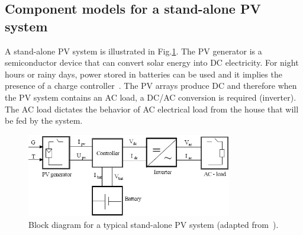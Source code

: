 \documentclass[review]{elsarticle}
\begin{document}
%
\subsection{Component models for a stand-alone PV system }
A stand-alone PV system is illustrated in Fig.\ref{fig:blockdiagram}. The PV generator is a semiconductor device that can convert solar energy into DC electricity. %
For night hours or rainy days, power stored in batteries can be used and it implies the presence of a charge controller~\citep{Hansen}. The PV arrays produce DC and therefore when the PV system contains an AC load, a DC/AC conversion is required (inverter). The AC load dictates the behavior of AC electrical load from the house that will be fed by the system.
%
%
\begin{figure}[h]
\includegraphics[width=0.80\textwidth]{blockdiagramPVS2}
\centering
\caption{Block diagram for a typical stand-alone PV system (adapted from~\citep{Hansen}).}
\label{fig:blockdiagram}
\end{figure}
%
\end{document}
